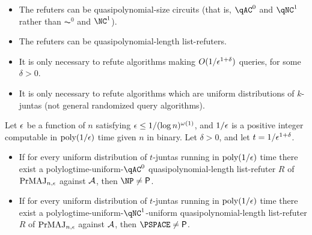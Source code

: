 \begin{itemize}
    \item The refuters can be quasipolynomial-size circuits (that is, $\qAC^0$ and 
    $\qNC^1$ rather than $\AC^0$ and $\NC^1$).
    \item The refuters can be quasipolynomial-length list-refuters. 
    \item It is only necessary to refute algorithms making $O(1/\epsilon^{1+\delta})$ queries,
    for some $\delta > 0$.
    \item It is only necessary to refute algorithms which are uniform distributions of
    $k$-juntas (not general randomized query algorithms).
\end{itemize}

\begin{theorem}
    Let $\epsilon$ be a function of $n$ satisfying $\epsilon \leq 1/(\log n)^{\omega(1)}$, and $1/\epsilon$ is a positive integer
    computable in $\text{poly}(1/\epsilon)$ time given $n$ in binary. Let $\delta > 0$, and let $t = 1/\epsilon^{1+\delta}$.
	\begin{itemize}
		\item If for every uniform distribution of $t$-juntas running in $\text{poly}(1/\epsilon)$ time there exist
        a polylogtime-uniform-$\qAC^0$ quasipolynomial-length list-refuter $R$ of $\mathrm{PrMAJ}_{n, \epsilon}$ against 
        $\mathcal{A}$, then $\NP \neq \PTIME$. 
		\item If for every uniform distribution of $t$-juntas running in $\text{poly}(1/\epsilon)$ time there exist
        a polylogtime-uniform-$\qNC^1$-uniform quasipolynomial-length list-refuter $R$ of $\mathrm{PrMAJ}_{n, \epsilon}$ against 
        $\mathcal{A}$, then $\PSPACE \neq \PTIME$. 
	\end{itemize}
\end{theorem}

